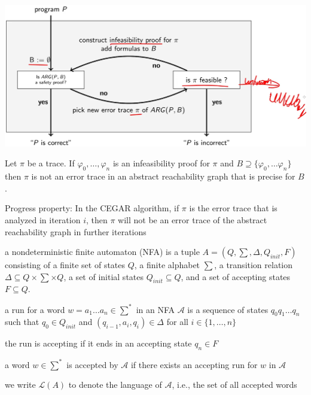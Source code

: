 \documentclass[landscape, a4paper]{article}
\begin{document}
\begin{minipage}[t]{0.2\linewidth}
\begin{betterlist}
		\includegraphics[width=\linewidth]{./figures/cegar_approach.png}
		\item Let $\pi$  be a trace. If $\varphi_0,\ldots , \varphi_n$ is an infeasibility proof for $\pi$  and $B \supseteq \{ \varphi_0,\ldots \varphi_n\}$  then $\pi$  is not an error trace in an abstract reachability graph that is precise for $B$. 
		\item \alert{Progress property:} In the CEGAR algorithm, if $\pi$ is the error trace that is analyzed in iteration $i$, then $\pi$ will not be an error trace of the abstract reachability graph in further iterations
	\end{betterlist}
	\begin{betterlist}
		\item a \alert{nondeterministic finite automaton (NFA)} is a tuple $A = (Q, \sum , \Delta , Q_{init}, F)$ consisting of a finite set of states $Q$, a finite alphabet $\sum$, a transition relation $\Delta \subseteq Q × \sum  × Q$, a set of initial states $Q_{init} \subseteq Q$, and a set of accepting states $F \subseteq Q$.
		\begin{betterlist}
			\item a \alert{run} for a word $w = a_1\ldots a_n \in \sum^{*}$ in an NFA $\mathcal{A}$ is a sequence of states $q_0q_1\ldots q_n$ such that $q_0 \in Q_{init}$ and $(q_{i−1}, a_{i}, q_{i}) \in \Delta$ for all $i \in \{1,\ldots , n\}$
			\begin{betterlist}
				\item the run is \alert{accepting} if it ends in an accepting state $q_n \in F$
			\end{betterlist}
			\item a word $w \in \sum ^*$ is \alert{accepted} by $\mathcal{A}$ if there exists an accepting run for $w$ in $\mathcal{A}$
			\item we write $\mathcal{L}(A)$ to denote the \alert{language of $\mathcal{A}$}, i.e., the set of all accepted words

\end{betterlist}
\end{betterlist}
\end{minipage}
\end{document}
